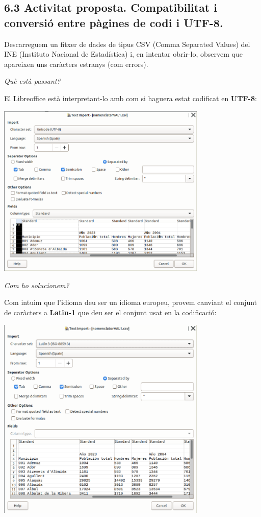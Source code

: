 \documentclass[
  12 pt,
  a4paper,
]{article}
\begin{document}
\subsection{6.3 Activitat proposta. Compatibilitat i conversió entre
pàgines de codi i
UTF-8.}\label{activitat-proposta.-compatibilitat-i-conversiuxf3-entre-puxe0gines-de-codi-i-utf-8.}

Descarreguem un fitxer de dades de tipus CSV (Comma Separated Values)
del INE (Instituto Nacional de Estadística) i, en intentar obrir-lo,
observem que apareixen uns caràcters estranys (com errors).

\emph{Què està passant?}

El Libreoffice està interpretant-lo amb com si haguera estat codificat
en \textbf{UTF-8}:

\includegraphics[width=0.75\textwidth,height=\textheight]{png/csv1.png}

\emph{Com ho solucionem?}

Com intuim que l'idioma deu ser un idioma europeu, provem canviant el
conjunt de caràcters a \textbf{Latin-1} que deu ser el conjunt usat en
la codificació:

\includegraphics[width=0.75\textwidth,height=\textheight]{png/csv2.png}
\end{document}
